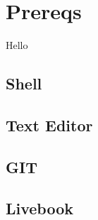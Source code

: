 \chapter{Prereqs}

Hello

\section{Shell}

\section{Text Editor}

\section{GIT}

\section{Livebook}

